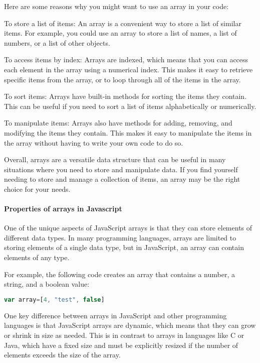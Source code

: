 {Here are some reasons why you might want to use an array in your code:

To store a list of items: An array is a convenient way to store a list of similar items. For example, you could use an array to store a list of names, a list of numbers, or a list of other objects.

To access items by index: Arrays are indexed, which means that you can access each element in the array using a numerical index. This makes it easy to retrieve specific items from the array, or to loop through all of the items in the array.

To sort items: Arrays have built-in methods for sorting the items they contain. This can be useful if you need to sort a list of items alphabetically or numerically.

To manipulate items: Arrays also have methods for adding, removing, and modifying the items they contain. This makes it easy to manipulate the items in the array without having to write your own code to do so.

Overall, arrays are a versatile data structure that can be useful in many situations where you need to store and manipulate data. If you find yourself needing to store and manage a collection of items, an array may be the right choice for your needs.


\paragraph{Properties of arrays in Javascript}

One of the unique aspects of JavaScript arrays is that they can store elements of different data types. In many programming languages, arrays are limited to storing elements of a single data type, but in JavaScript, an array can contain elements of any type.

For example, the following code creates an array that contains a number, a string, and a boolean value:

\begin{lstlisting}[language=Javascript]
var array=[4, "test", false]
\end{lstlisting}

One key difference between arrays in JavaScript and other programming languages is that JavaScript arrays are dynamic, which means that they can grow or shrink in size as needed. This is in contrast to arrays in languages like C or Java, which have a fixed size and must be explicitly resized if the number of elements exceeds the size of the array.



}
